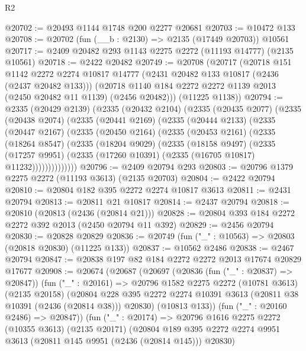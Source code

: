 \begin{lexlean}{R2}
\begin{coremodule}
@20702 := @20493 @1144 @1748 @200 @2277 @20681
@20703 := @10472 @133
@20708 := @20702 (fun (__b : @2130) => @2135 (@17449 @20703)) @10561
@20717 := @2409 @20482 @293 @1143 @2275 @2272 (@11193 @14777) (@2135 @10561)
@20718 := @2422 @20482
@20749 := @20708
    (@20717
      (@20718
        @151
        @1142
        @2272
        @2274
        @10817
        @14777
        (@2431 @20482 @133 @10817 (@2436 (@2437 @20482 @133)))
        (@20718 @1140 @184 @2272 @2272 @1139 @2013 (@2450 @20482 @11 @1139) (@2456 @20482)))
      (@11225 @1138))
@20794 := @2335
    (@20429 @2139)
    (@2335
      (@20432 @2104)
      (@2335
        (@20435 @2077)
        (@2335
          (@20438 @2074)
          (@2335
            (@20441 @2169)
            (@2335
              (@20444 @2133)
              (@2335
                (@20447 @2167)
                (@2335
                  (@20450 @2164)
                  (@2335
                    (@20453 @2161)
                    (@2335
                      (@18264 @8547)
                      (@2335
                        (@18204 @9029)
                        (@2335
                          (@18158 @9497)
                          (@2335
                            (@17257 @9951)
                            (@2335 (@17260 @10391) (@2335 (@16705 @10817) @11232))))))))))))))
@20796 := @2409 @20794 @293
@20803 := @20796 @1379 @2275 @2272 (@11193 @3613) (@2135 @20703)
@20804 := @2422 @20794
@20810 := @20804 @182 @395 @2272 @2274 @10817 @3613
@20811 := @2431 @20794
@20813 := @20811 @21 @10817
@20814 := @2437 @20794
@20818 := @20810 (@20813 (@2436 (@20814 @21)))
@20828 := @20804 @393 @184 @2272 @2272 @392 @2013 (@2450 @20794 @11 @392)
@20829 := @2456 @20794
@20830 := @20828 @20829
@20836 := @20749 (fun ("_" : @10563) => @20803 (@20818 @20830) (@11225 @133))
@20837 := @10562 @2486
@20838 := @2467 @20794
@20847 := @20838 @197 @82 @184 @2272 @2272 @2013 @17674 @20829 @17677
@20908 := @20674
    (@20687
      (@20697
        (@20836 (fun ("_" : @20837) => @20847))
        (fun ("_" : @20161) =>
        @20796
          @1582
          @2275
          @2272
          (@10781 @3613)
          (@2135 @20158)
          (@20804
            @228
            @395
            @2272
            @2274
            @10391
            @3613
            (@20811 @38 @10391 (@2436 (@20814 @38)))
            @20830)
          (@10813 @133))
        (fun ("_" : @20160 @2486) => @20847))
      (fun ("_" : @20174) =>
      @20796
        @1616
        @2275
        @2272
        (@10355 @3613)
        (@2135 @20171)
        (@20804 @189 @395 @2272 @2274 @9951 @3613 (@20811 @145 @9951 (@2436 (@20814 @145))) @20830)

\end{coremodule}
\end{lexlean}
